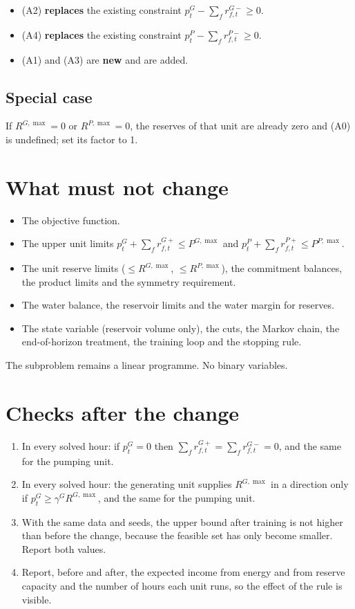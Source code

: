\documentclass[11pt,a4paper]{article}
\begin{document}
\begin{itemize}
\item (A2) \textbf{replaces} the existing constraint
      $p^G_t-\sum_f r^{G-}_{f,t}\ge 0$.
\item (A4) \textbf{replaces} the existing constraint
      $p^P_t-\sum_f r^{P-}_{f,t}\ge 0$.
\item (A1) and (A3) are \textbf{new} and are added.
\end{itemize}

\subsection{Special case}
If $R^{G,\max}=0$ or $R^{P,\max}=0$, the reserves of that unit are already
zero and (A0) is undefined; set its factor to 1.

\section{What must not change}
\begin{itemize}
\item The objective function.
\item The upper unit limits $p^G_t+\sum_f r^{G+}_{f,t}\le P^{G,\max}$ and
      $p^P_t+\sum_f r^{P+}_{f,t}\le P^{P,\max}$.
\item The unit reserve limits ($\le R^{G,\max}$, $\le R^{P,\max}$), the
      commitment balances, the product limits and the symmetry requirement.
\item The water balance, the reservoir limits and the water margin for
      reserves.
\item The state variable (reservoir volume only), the cuts, the Markov
      chain, the end-of-horizon treatment, the training loop and the
      stopping rule.
\end{itemize}
The subproblem remains a linear programme. No binary variables.

\section{Checks after the change}
\begin{enumerate}
\item In every solved hour: if $p^G_t=0$ then
      $\sum_f r^{G+}_{f,t}=\sum_f r^{G-}_{f,t}=0$, and the same for the
      pumping unit.
\item In every solved hour: the generating unit supplies $R^{G,\max}$ in a
      direction only if $p^G_t\ge\gamma^G R^{G,\max}$, and the same for the
      pumping unit.
\item With the same data and seeds, the upper bound after training is not
      higher than before the change, because the feasible set has only
      become smaller. Report both values.
\item Report, before and after, the expected income from energy and from
      reserve capacity and the number of hours each unit runs, so the
      effect of the rule is visible.
\end{enumerate}
\end{document}
